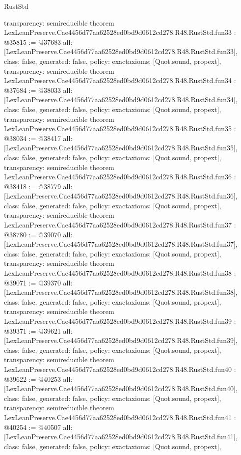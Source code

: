 \begin{lexlean}{RustStd}
\begin{coremodule}
{  transparency: semireducible
}
theorem LexLeanPreserve.Cae4456d77aa62528ed0bd9d0612cd278.R48.RustStd.fun33 : @35815 := @37683 {
  all: [LexLeanPreserve.Cae4456d77aa62528ed0bd9d0612cd278.R48.RustStd.fun33],
  class: false,
  generated: false,
  policy: exact{axioms: [Quot.sound, propext]},
  transparency: semireducible
}
theorem LexLeanPreserve.Cae4456d77aa62528ed0bd9d0612cd278.R48.RustStd.fun34 : @37684 := @38033 {
  all: [LexLeanPreserve.Cae4456d77aa62528ed0bd9d0612cd278.R48.RustStd.fun34],
  class: false,
  generated: false,
  policy: exact{axioms: [Quot.sound, propext]},
  transparency: semireducible
}
theorem LexLeanPreserve.Cae4456d77aa62528ed0bd9d0612cd278.R48.RustStd.fun35 : @38034 := @38417 {
  all: [LexLeanPreserve.Cae4456d77aa62528ed0bd9d0612cd278.R48.RustStd.fun35],
  class: false,
  generated: false,
  policy: exact{axioms: [Quot.sound, propext]},
  transparency: semireducible
}
theorem LexLeanPreserve.Cae4456d77aa62528ed0bd9d0612cd278.R48.RustStd.fun36 : @38418 := @38779 {
  all: [LexLeanPreserve.Cae4456d77aa62528ed0bd9d0612cd278.R48.RustStd.fun36],
  class: false,
  generated: false,
  policy: exact{axioms: [Quot.sound, propext]},
  transparency: semireducible
}
theorem LexLeanPreserve.Cae4456d77aa62528ed0bd9d0612cd278.R48.RustStd.fun37 : @38780 := @39070 {
  all: [LexLeanPreserve.Cae4456d77aa62528ed0bd9d0612cd278.R48.RustStd.fun37],
  class: false,
  generated: false,
  policy: exact{axioms: [Quot.sound, propext]},
  transparency: semireducible
}
theorem LexLeanPreserve.Cae4456d77aa62528ed0bd9d0612cd278.R48.RustStd.fun38 : @39071 := @39370 {
  all: [LexLeanPreserve.Cae4456d77aa62528ed0bd9d0612cd278.R48.RustStd.fun38],
  class: false,
  generated: false,
  policy: exact{axioms: [Quot.sound, propext]},
  transparency: semireducible
}
theorem LexLeanPreserve.Cae4456d77aa62528ed0bd9d0612cd278.R48.RustStd.fun39 : @39371 := @39621 {
  all: [LexLeanPreserve.Cae4456d77aa62528ed0bd9d0612cd278.R48.RustStd.fun39],
  class: false,
  generated: false,
  policy: exact{axioms: [Quot.sound, propext]},
  transparency: semireducible
}
theorem LexLeanPreserve.Cae4456d77aa62528ed0bd9d0612cd278.R48.RustStd.fun40 : @39622 := @40253 {
  all: [LexLeanPreserve.Cae4456d77aa62528ed0bd9d0612cd278.R48.RustStd.fun40],
  class: false,
  generated: false,
  policy: exact{axioms: [Quot.sound, propext]},
  transparency: semireducible
}
theorem LexLeanPreserve.Cae4456d77aa62528ed0bd9d0612cd278.R48.RustStd.fun41 : @40254 := @40507 {
  all: [LexLeanPreserve.Cae4456d77aa62528ed0bd9d0612cd278.R48.RustStd.fun41],
  class: false,
  generated: false,
  policy: exact{axioms: [Quot.sound, propext]},
}
\end{coremodule}
\end{lexlean}
